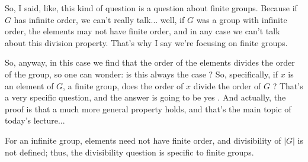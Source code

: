 \begin{speech}[00:08:57 - 00:10:04]
So, I said, like, this kind of question is a question about finite groups. Because if $G$ has infinite order, we can't really talk... well, if $G$ was a group with infinite order, the elements may not have finite order, and in any case we can't talk about this division property. That's why I say we're focusing on finite groups.

So, anyway, in this case we find that the order of the elements divides the order of the group, so one can wonder: is this always the case ? So, specifically, if $x$ is an element of $G$, a finite group, does the order of $x$ divide the order of $G$ ? That's a very specific question, and the answer is going to be yes . And actually, the proof is that a much more general property holds, and that's the main topic of today's lecture...
\end{speech}

\begin{content}
For an infinite group, elements need not have finite order, and divisibility of $|G|$ is not defined; thus, the divisibility question is specific to finite groups.


\end{content}

